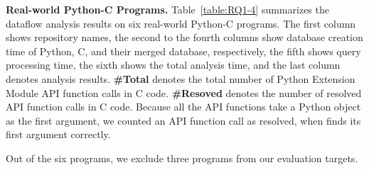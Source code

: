 

\textbf{Real-world Python-C Programs.}
Table~\ref{table:RQ1-4} summarizes the dataflow analysis results on six
real-world Python-C programs. 
The first column shows repository names, the second to the fourth columns show
database creation time of Python, C, and their merged database, respectively,
the fifth shows query processing time, the sixth shows the total analysis time,
and the last column denotes analysis results.
{\bf \#Total} denotes the total number of Python Extension Module API function
calls in C code. 
{\bf \#Resoved} denotes the number of resolved API function calls in C code.
Because all the API functions take a Python object as the first argument, we
counted an API function call as resolved, when \ours finds its first argument
correctly. 



Out of the six programs, we exclude three programs from our evaluation targets.


